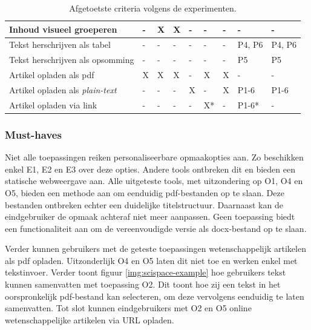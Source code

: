 \begin{table}[H]
\begin{tabular}{ | m{8cm} | m{0.5cm} | m{0.5cm} | m{0.5cm} | m{0.5cm} | m{0.5cm} | m{0.5cm} | m{1cm} | m{1cm} | }
		Inhoud visueel groeperen & - & X & X & - & - & - & - & - \\ \hline
		Tekst herschrijven als tabel & - & - & - & - & - & - & P4, P6 & P4, P6 \\ \hline
		Tekst herschrijven als opsomming & - & - & - & - & - & - & P5 & P5 \\ \hline
		Artikel opladen als pdf & X & X & X & - & X & X & - & - \\ \hline
		Artikel opladen als \textit{plain-text} & - & - & - & X & - & X & P1-6 & P1-6 \\ \hline
		Artikel opladen via link & - & - & - & - & X* & - & P1-6* & - \\ \hline
	\end{tabular}
	\caption{Afgetoetste criteria volgens de experimenten.}
	\label{table:afgetoetste-criteria}
\end{table}

\subsubsection{Must-haves}

Niet alle toepassingen reiken personaliseerbare opmaakopties aan. Zo beschikken enkel E1, E2 en E3 over deze opties. Andere tools ontbreken dit en bieden een statische webweergave aan. Alle uitgeteste tools, met uitzondering op O1, O4 en O5, bieden een methode aan om eenduidig pdf-bestanden op te slaan. Deze bestanden ontbreken echter een duidelijke titelstructuur. Daarnaast kan de eindgebruiker de opmaak achteraf niet meer aanpassen. Geen toepassing biedt een functionaliteit aan om de vereenvoudigde versie als docx-bestand op te slaan. 

\medspace

Verder kunnen gebruikers met de geteste toepassingen wetenschappelijk artikelen als pdf opladen. Uitzonderlijk O4 en O5 laten dit niet toe en werken enkel met tekstinvoer. Verder toont figuur \ref{img:scispace-example} hoe gebruikers tekst kunnen samenvatten met toepassing O2. Dit toont hoe zij een tekst in het oorspronkelijk pdf-bestand kan selecteren, om deze vervolgens eenduidig te laten samenvatten. Tot slot kunnen eindgebruikers met O2 en O5 online wetenschappelijke artikelen via URL opladen.


